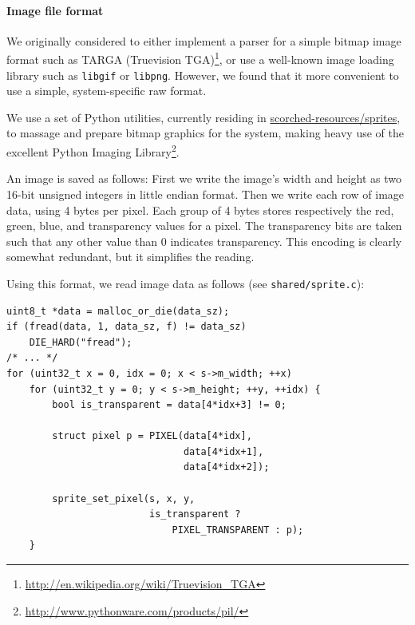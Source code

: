 \documentclass[a4paper,10pt]{article}
\begin{document}
\paragraph{Image file format}
We originally considered to either implement a parser for a simple bitmap
image format such as TARGA (Truevision
TGA)\footnote{\url{http://en.wikipedia.org/wiki/Truevision_TGA}}, or use a
well-known image loading library such as \texttt{libgif} or \texttt{libpng}. 
However, we found that it more convenient to use a simple, system-specific raw
format.

We use a set of Python utilities, currently residing in
\url{scorched-resources/sprites}, to massage and prepare bitmap graphics
for the system, making heavy use of the excellent Python Imaging
Library\footnote{\url{http://www.pythonware.com/products/pil/}}. 

An image is saved as follows: First we write the image's width and height as
two 16-bit unsigned integers in little endian format. Then we write each row
of image data, using 4 bytes per pixel. Each group of 4 bytes stores
respectively the red, green, blue, and transparency values for a pixel. The
transparency bits are taken such that any other value than 0 indicates
transparency. This encoding is clearly somewhat redundant, but it simplifies
the reading.

Using this format, we read image data as follows (see
\texttt{shared/sprite.c}):

\begin{lstlisting}
uint8_t *data = malloc_or_die(data_sz);
if (fread(data, 1, data_sz, f) != data_sz)
    DIE_HARD("fread");
/* ... */
for (uint32_t x = 0, idx = 0; x < s->m_width; ++x)
    for (uint32_t y = 0; y < s->m_height; ++y, ++idx) {
        bool is_transparent = data[4*idx+3] != 0;

        struct pixel p = PIXEL(data[4*idx], 
                               data[4*idx+1], 
                               data[4*idx+2]);

        sprite_set_pixel(s, x, y, 
                         is_transparent ? 
                             PIXEL_TRANSPARENT : p);
    }
\end{lstlisting}
\end{document}
